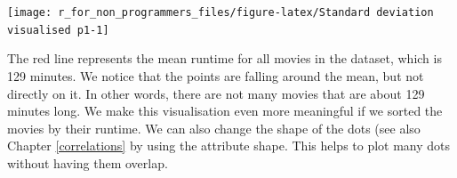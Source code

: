 \documentclass[
]{book}
\newenvironment{Shaded}{\begin{snugshade}}{\end{snugshade}}
\newcommand{\AttributeTok}[1]{\textcolor[rgb]{0.77,0.63,0.00}{#1}}
\newcommand{\CommentTok}[1]{\textcolor[rgb]{0.56,0.35,0.01}{\textit{#1}}}
\newcommand{\ConstantTok}[1]{\textcolor[rgb]{0.00,0.00,0.00}{#1}}
\newcommand{\FunctionTok}[1]{\textcolor[rgb]{0.00,0.00,0.00}{#1}}
\newcommand{\NormalTok}[1]{#1}
\newcommand{\OtherTok}[1]{\textcolor[rgb]{0.56,0.35,0.01}{#1}}
\newcommand{\SpecialCharTok}[1]{\textcolor[rgb]{0.00,0.00,0.00}{#1}}
\newcommand{\StringTok}[1]{\textcolor[rgb]{0.31,0.60,0.02}{#1}}
\begin{document}
\begin{Shaded}
\end{Shaded}

\begin{center}\texttt{[image: r\_for\_non\_programmers\_files/figure-latex/Standard deviation visualised p1-1]} \end{center}

The red line represents the mean runtime for all movies in the dataset, which is 129 minutes. We notice that the points are falling around the mean, but not directly on it. In other words, there are not many movies that are about 129 minutes long. We make this visualisation even more meaningful if we sorted the movies by their runtime. We can also change the shape of the dots (see also Chapter \ref{correlations} by using the attribute shape. This helps to plot many dots without having them overlap.
\end{document}
